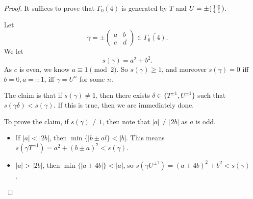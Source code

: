 \documentclass[a4paper]{article}
\begin{document}
\begin{proof}
  It suffices to prove that $\overline{\Gamma_0(4)}$ is generated by $T$ and $U = \pm \begin{psmallmatrix} 1 & 0\\ 4 & 1 \end{psmallmatrix}$.

  Let
  \[
    \gamma = \pm
    \begin{pmatrix}
      a & b\\
      c & d
    \end{pmatrix} \in \overline{\Gamma_0(4)}.
  \]
  We let
  \[
    s(\gamma) = a^2 + b^2.
  \]
  As $c$ is even, we know $a \equiv 1 \pmod 2$. So $s(\gamma) \geq 1$, and moreover $s(\gamma) = 0$ iff $b = 0, a = \pm 1$, iff $\gamma = U^n$ for some $n$.

  The claim is that if $s(\gamma) \not= 1$, then there exists $\delta \in \{T^{\pm 1}, U^{\pm 1}\}$  such that $s(\gamma\delta) < s(\gamma)$. If this is true, then we are immediately done.

  To prove the claim, if $s(\gamma) \not= 1$, then note that $|a| \not= |2b|$ as $a$ is odd.
  \begin{itemize}
    \item If $|a| < |2b|$, then $\min\{|b \pm al\} < |b|$. This means $s(\gamma T^{\pm 1}) = a^2 + (b \pm a)^2 < s(\gamma)$.
    \item $|a| > |2b|$, then $\min \{|a \pm 4b|\} < |a|$, so $s(\gamma U^{\pm 1}) = (a \pm 4b)^2 + b^2 <  s(\gamma)$.
  \end{itemize}
\end{proof}


\printindex
\end{document}
